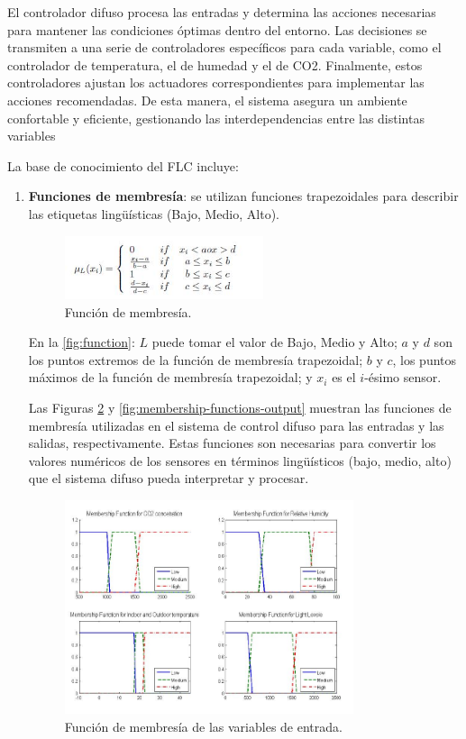 El controlador difuso procesa las entradas y determina las acciones necesarias para mantener las condiciones óptimas dentro del entorno. Las decisiones se transmiten a una serie de controladores específicos para cada variable, como el controlador de temperatura, el de humedad y el de CO2. Finalmente, estos controladores ajustan los actuadores correspondientes para implementar las acciones recomendadas. De esta manera, el sistema asegura un ambiente confortable y eficiente, gestionando las interdependencias entre las distintas variables

\vspace{0.4cm}

La base de conocimiento del FLC incluye:
\begin{enumerate}
	\item \textbf{Funciones de membresía}: se utilizan funciones trapezoidales para describir las etiquetas lingüísticas (Bajo, Medio, Alto).
	\begin{figure}[H]
		\centering
		\includegraphics[width=0.55\textwidth]{imgs/function.JPG}
		\caption{Función de membresía.}
		\label{fig:function}
	\end{figure}
	
	En la \autoref{fig:function}: $L$ puede tomar el valor de Bajo, Medio y Alto; $a$ y $d$ son los puntos extremos de la función de membresía trapezoidal; $b$ y $c$, los puntos máximos de la función de membresía trapezoidal; y $x_i$ es el $i$-ésimo sensor.
	
	Las Figuras \ref{fig:membership-functions-input} y \ref{fig:membership-functions-output} muestran las funciones de membresía utilizadas en el sistema de control difuso para las entradas y las salidas, respectivamente. Estas funciones son necesarias para convertir los valores numéricos de los sensores en términos lingüísticos (bajo, medio, alto) que el sistema difuso pueda interpretar y procesar.
	
	\begin{figure}[H]
		\centering
		\includegraphics[width=0.8\textwidth]{imgs/membership-functions-input.JPG}
		\caption{Función de membresía de las variables de entrada.}
		\label{fig:membership-functions-input}
	\end{figure}
	

\end{enumerate}
